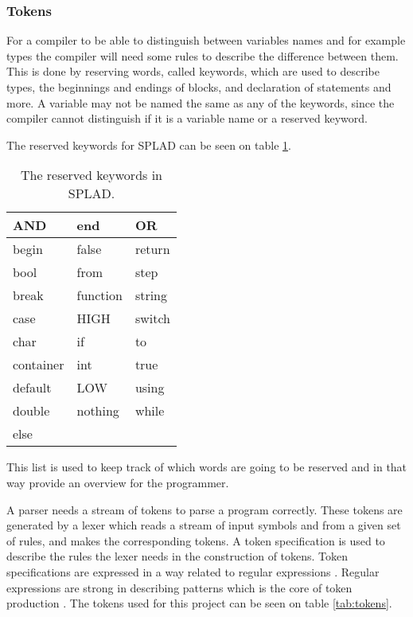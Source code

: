 \subsubsection{Tokens}
For a compiler to be able to distinguish between variables names and for example types the compiler will need some rules to describe the difference between them. This is done by reserving words, called keywords, which are used to describe types, the beginnings and endings of blocks, and declaration of statements and more. A variable may not be named the same as any of the keywords, since the compiler cannot distinguish if it is a variable name or a reserved keyword.

The reserved keywords for SPLAD can be seen on table \ref{tab:keywords}.

\begin{table}[H]
	\begin{tabular}{|l|l|l|}
		\hline
		AND			&	end			&	OR		\\ \hline
		begin 		&	false		&	return	\\ \hline
		bool 		&	from		&	step	\\ \hline
		break 		&	function	&	string	\\ \hline
		case 		&	HIGH		&	switch	\\ \hline
		char 		&	if			&	to		\\ \hline
		container 	&	int			&	true	\\ \hline
		default 	&	LOW			&	using	\\ \hline
		double 		&	nothing		&	while	\\ \hline
		else 		&	~			&	~		\\ \hline
	\end{tabular}
	\caption{The reserved keywords in SPLAD.}
	\label{tab:keywords}
\end{table}

This list is used to keep track of which words are going to be reserved and in that way provide an overview for the programmer. 

A parser needs a stream of tokens to parse a program correctly. These tokens are generated by a lexer which reads a stream of input symbols and from a given set of rules, and makes the corresponding tokens. A token specification is used to describe the rules the lexer needs in the construction of tokens. Token specifications are expressed in a way related to regular expressions \citep{sebesta}. Regular expressions are strong in describing patterns which is the core of token production \citep{sipser}. The tokens used for this project can be seen on table \ref{tab:tokens}.

